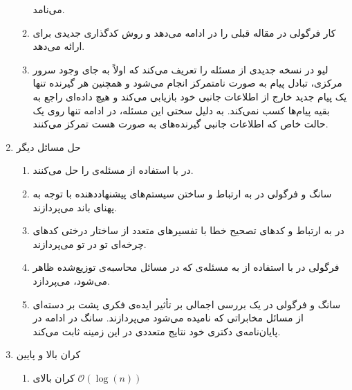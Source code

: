 \begin{enumerate}
\begin{enumerate}
 		می‌نامد.
 		\item 
 		 کار فرگولی در مقاله قبلی را در
 		\cite{8625330}
 		ادامه می‌دهد و روش کدگذاری جدیدی برای 
 		ارائه می‌دهد.
 		\item 
 		لیو در
 		\cite{9173957}
 		نسخه جدیدی از مسئله را تعریف می‌کند که اولاً به جای وجود سرور مرکزی، تبادل پیام به صورت نامتمرکز انجام می‌شود و همچنین هر گیرنده تنها یک پیام جدید خارج از اطلاعات جانبی خود بازیابی می‌کند و هیچ داده‌ای راجع به بقیه پیام‌ها کسب نمی‌کند. به دلیل سختی این مسئله، در ادامه تنها روی یک حالت خاص که اطلاعات جانبی گیرنده‌های به صورت
 		هست تمرکز می‌کنند.	
 		
 	\end{enumerate}
 	\item حل مسائل دیگر
 	\begin{enumerate}
 		\item 
 		در
 		\cite{Obead_2023}
 		با استفاده از  
 		\picod
 		مسئله‌ی
 		را حل می‌کنند.
 		\item
 		سانگ و فرگولی در
 		\cite{8404065}
 		به ارتباط 
 		\picod
 		و ساختن سیستم‌های پیشنهاددهنده‌ با توجه به پهنای باند می‌پردازند.
 		\item
 		در
 		\cite{e24081149}
 		به ارتباط 
 		\icod
 		و
 		\picod
 		کدهای تصحیح خطا با تفسیرهای متعدد از ساختار درختی کدهای چرخه‌ای تو در تو
 		می‌پردازند.
 		\item 
 		فرگولی در
 		\cite{datashuf}
 		با استفاده از
 		\picod
 		به مسئله‌ی
 		که در مسائل محاسبه‌ی توزیع‌شده ظاهر می‌شود، می‌پردازد.
 		\item
 		سانگ و فرگولی در
 		\cite{7176784}
 		یک بررسی‌ اجمالی بر تأثیر ایده‌ی فکری پشت
 		\picod
 		بر دسته‌ای از مسائل مخابراتی که
 		نامیده می‌شود می‌پردازند. سانگ در ادامه در پایان‌نامه‌ی دکتری خود
 		\cite{linqiphd}
 		نتایج متعددی در این زمینه ثابت می‌کند.
 	\end{enumerate}
 	\item کران بالا و پایین
 	\begin{enumerate}
 		\item 
 		کران بالای
 		$\mathcal{O}(\log(n))$

\end{enumerate}
\end{enumerate}
